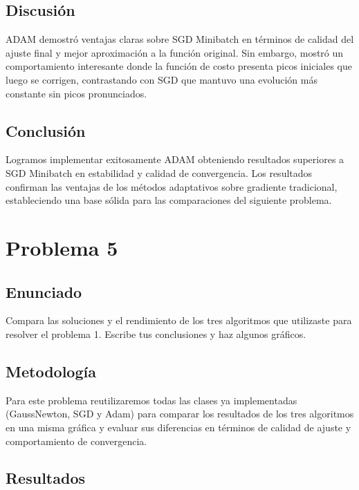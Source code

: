 \documentclass{article}
\begin{document}
\subsection{Discusión}

ADAM demostró ventajas claras sobre SGD Minibatch en términos de calidad del ajuste final y mejor aproximación a la función original. Sin embargo, mostró un comportamiento interesante donde la función de costo presenta picos iniciales que luego se corrigen, contrastando con SGD que mantuvo una evolución más constante sin picos pronunciados.

\subsection{Conclusión}

Logramos implementar exitosamente ADAM obteniendo resultados superiores a SGD Minibatch en estabilidad y calidad de convergencia. Los resultados confirman las ventajas de los métodos adaptativos sobre gradiente tradicional, estableciendo una base sólida para las comparaciones del siguiente problema.


\section{Problema 5}

\subsection{Enunciado}

Compara las soluciones y el rendimiento de los tres algoritmos que utilizaste para resolver el problema 1. Escribe tus conclusiones y haz algunos gráficos.

\subsection{Metodología}

Para este problema reutilizaremos todas las clases ya implementadas (GaussNewton, SGD y Adam) para comparar los resultados de los tres algoritmos en una misma gráfica y evaluar sus diferencias en términos de calidad de ajuste y comportamiento de convergencia.

\subsection{Resultados}
\setcounter{equation}{0}
\end{document}
